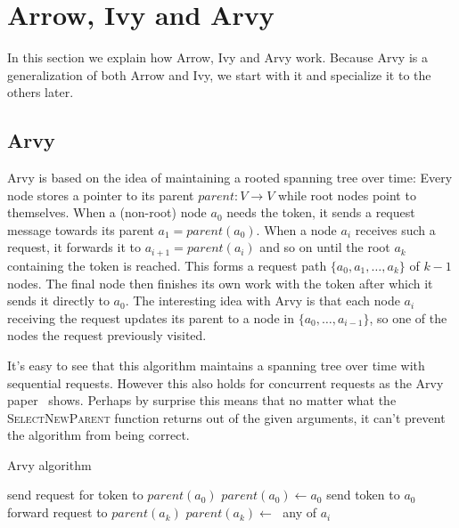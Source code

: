 \documentclass[a4paper, oneside]{discothesis}
\begin{document}
\section{Arrow, Ivy and Arvy}

In this section we explain how Arrow, Ivy and Arvy work. Because Arvy is a generalization of both Arrow and Ivy, we start with it and specialize it to the others later.

\subsection{Arvy}

Arvy is based on the idea of maintaining a rooted spanning tree over time: Every node stores a pointer to its parent $parent : V \rightarrow V$ while root nodes point to themselves. When a (non-root) node $a_0$ needs the token, it sends a request message towards its parent $a_1=parent(a_0)$. When a node $a_i$ receives such a request, it forwards it to $a_{i+1}=parent(a_i)$ and so on until the root $a_k$ containing the token is reached. This forms a request path $\{a_0,a_1,\dots,a_k\}$ of $k-1$ nodes. The final node then finishes its own work with the token after which it sends it directly to $a_0$. The interesting idea with Arvy is that each node $a_i$ receiving the request updates its parent to a node in $\{a_0, \dots, a_{i-1}\}$, so one of the nodes the request previously visited.

It's easy to see that this algorithm maintains a spanning tree over time with sequential requests. However this also holds for concurrent requests as the Arvy paper~\cite{Arvy} shows. Perhaps by surprise this means that no matter what the \textsc{SelectNewParent} function returns out of the given arguments, it can't prevent the algorithm from being correct.

\begin{algorithm}
\caption{Arvy algorithm}
\label{test}
\begin{algorithmic}

    \State send request for token to $parent(a_0)$
    \State $parent(a_0)\gets a_0$
\EndIf
\EndFunction
{}
    \State send token to $a_0$
\Else
    \State forward request to $parent(a_k)$
\EndIf
\State $parent(a_k)\gets\;$
\EndFunction
{}
\State\Return any of $a_i$
\EndFunction
\end{algorithmic}
\end{algorithm}
\end{document}
